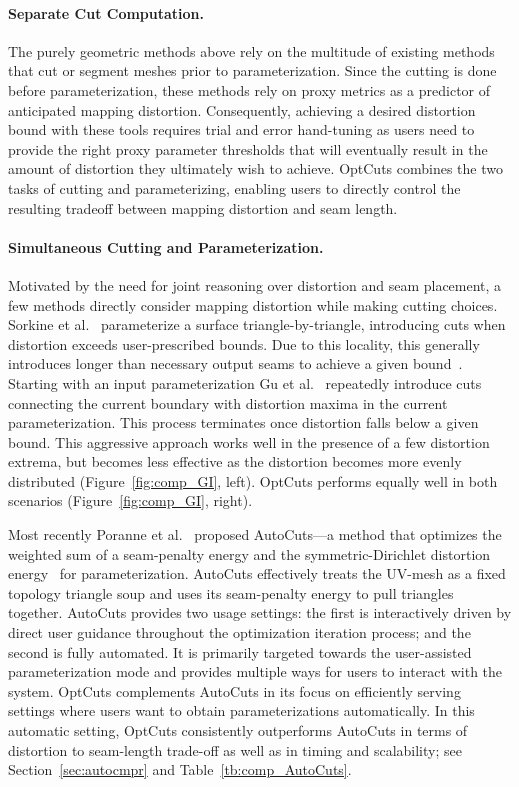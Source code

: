 \paragraph{Separate Cut Computation.}
The purely geometric methods above rely on the multitude of existing methods that cut or segment meshes prior to parameterization.
Since the cutting is done before parameterization, these methods rely on proxy metrics as a predictor of anticipated mapping distortion. Consequently, achieving a desired distortion bound with these tools requires trial and error hand-tuning as users need to provide the right proxy parameter thresholds that will eventually result in the amount of distortion they ultimately wish to achieve. OptCuts combines the two tasks of cutting and parameterizing, enabling users to directly control the resulting tradeoff between mapping distortion and seam length. 

\paragraph{Simultaneous Cutting and Parameterization.}
Motivated by the need for joint reasoning over distortion and seam placement, a few methods directly consider mapping distortion while making cutting choices. 
Sorkine et al.~ parameterize a surface triangle-by-triangle, introducing cuts when distortion exceeds user-prescribed bounds. Due to this locality, this generally introduces longer than necessary output seams to achieve a given bound~\cite{Hormann2008,Poranne2017Autocuts}. 
Starting with an input parameterization Gu et al.~  repeatedly introduce cuts connecting the current boundary with distortion maxima in the current parameterization. This process terminates once distortion falls below a given bound. This aggressive approach works well in the presence of a few distortion extrema, but becomes less effective as the distortion becomes more evenly distributed (Figure~\ref{fig:comp_GI}, left). OptCuts performs equally well in both scenarios (Figure~\ref{fig:comp_GI}, right).  

Most recently Poranne et al.\  proposed AutoCuts---a method that optimizes the weighted sum of a seam-penalty energy and the symmetric-Dirichlet distortion energy~\cite{Smith2015Bijective} for parameterization. AutoCuts effectively treats the UV-mesh as a fixed topology triangle soup and uses its seam-penalty energy to pull triangles together. AutoCuts provides two usage settings: the first is interactively driven by direct user guidance throughout the optimization iteration process; and the second is fully automated. It is primarily targeted towards the user-assisted parameterization mode and provides multiple ways for users to interact with the system. OptCuts complements AutoCuts in its focus on efficiently serving settings where users want to obtain parameterizations automatically. In this automatic setting, OptCuts consistently outperforms AutoCuts in terms of distortion to seam-length trade-off as well as in timing and scalability; see Section~\ref{sec:autocmpr} and Table~\ref{tb:comp_AutoCuts}. 

